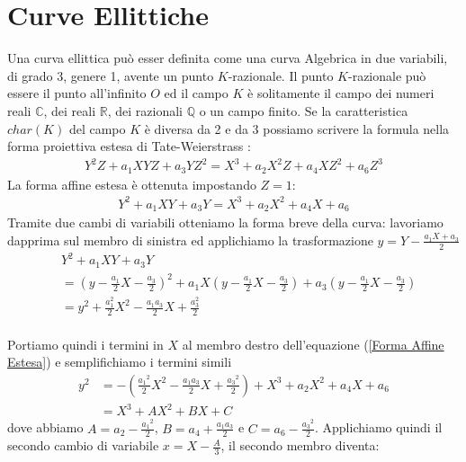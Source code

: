 \documentclass[a4paper,12pt]{tesiinfo}
\newcommand\ddfrac[2]{\frac{\displaystyle #1}{\displaystyle #2}}
\begin{document}
\chapter{Curve Ellittiche}
Una curva ellittica pu\`o esser definita come una curva Algebrica in due variabili, di grado 3, genere 1, avente un punto $K$-razionale. Il punto $K$-razionale pu\`o essere il punto all'infinito $O$ ed il campo $K$ \`e solitamente il campo dei numeri reali $\mathbb{C}$, dei reali $\mathbb{R}$, dei razionali $\mathbb{Q}$ o un campo finito. Se la caratteristica $char(K)$ del campo $K$ \`e diversa da 2 e da 3 possiamo scrivere la formula nella forma proiettiva estesa di Tate-Weierstrass :
\begin{gather}
Y^{2}Z + a_1XYZ + a_3YZ^2 =X^3 + a_2X^2Z + a_4XZ^2 + a_6Z^3
\end{gather}
La forma affine estesa \`e ottenuta impostando $Z=1$: 
\begin{gather}
Y^{2} + a_1XY + a_3Y =X^3 + a_2X^2 + a_4X + a_6
\label{Forma Affine Estesa}
\end{gather}
Tramite due cambi di variabili otteniamo la forma breve della curva: lavoriamo dapprima sul membro di sinistra ed applichiamo la trasformazione $y = Y - \ddfrac{a_1X + a_3}{2}$
\begin{align*}
&Y^{2} + a_1XY + a_3Y 
\\ 
&= \left ( y - \ddfrac{a_1}{2}X - \ddfrac{a_3}{2} \right )^2 + a_1X \left ( y - \ddfrac{a_1}{2}X - \ddfrac{a_3}{2} \right ) + a_3 \left ( y - \ddfrac{a_1}{2}X - \ddfrac{a_3}{2} \right ) 
\\
&= y^2 + \ddfrac{a_1^2}{2}X^2 - \ddfrac{a_1a_3}{2}X +\ddfrac{a_3^2}{2} 
\end{align*}
\\
Portiamo quindi i termini in $X$ al membro destro dell'equazione (\ref{Forma Affine Estesa}) e semplifichiamo i termini simili
\begin{align*}
y^2 &= - \left ( \ddfrac{{a_1}^2}{2}X^2 - \ddfrac{a_1a_3}{2}X +\ddfrac{{a_3}^2}{2} \right ) + X^3 + a_2X^2 + a_4X + a_6
\\
&= X^3 + AX^2 + BX + C 
\end{align*}
dove abbiamo $A = a_2 - \ddfrac{{a_1}^2}{2}$, $B = a_4 + \ddfrac{a_1a_3}{2}$ e $C = a_6 - \ddfrac{{a_3}^2}{2}$.
Applichiamo quindi il secondo cambio di variabile $x = X - \ddfrac{A}{3}$, il secondo membro diventa:
\end{document}
